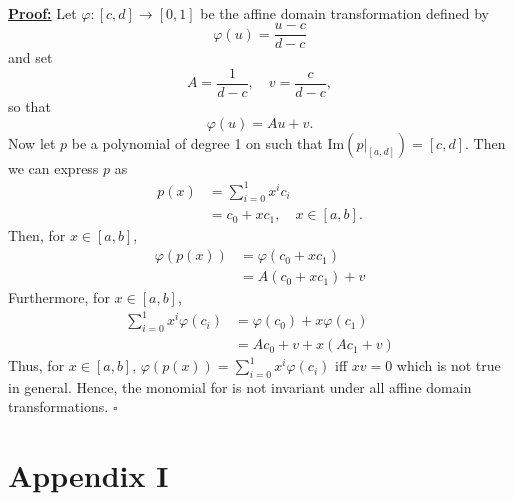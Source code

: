 \documentclass[]{article}
\begin{document}
\\
\underline{\textbf{Proof:}} Let $\varphi:[c, d]\rightarrow [0, 1]$ be the affine domain transformation defined by \begin{equation*}
\varphi(u) = \frac{u - c}{d - c}
\end{equation*} 
and set \begin{equation*}
A=\frac{1}{d-c}, \quad v = \frac{c}{d - c},
\end{equation*}
so that \begin{equation*}
\varphi(u) = Au + v.
\end{equation*}
Now let $p$ be a polynomial of degree 1 on such that $\mathrm{Im}(p|_{[a, d]}) = [c, d]$. Then we can express $p$ as \begin{equation*}
\begin{aligned}
p(x) &= \sum_{i=0}^{1}x^ic_i\\
&=c_0 + xc_1, \quad x\in [a, b].
\end{aligned}
\end{equation*}
Then, for $x\in [a, b]$, \begin{equation*}
\begin{aligned}
\varphi(p(x)) &= \varphi(c_0 + xc_1)\\
&=A(c_0 + xc_1) + v
\end{aligned}
\end{equation*}
Furthermore, for $x\in [a, b]$, \begin{equation*}
\begin{aligned}
\sum_{i=0}^{1} x^i\varphi(c_i) &= \varphi(c_0) + x\varphi(c_1)\\
&=Ac_0 + v + x(Ac_1 + v)
\end{aligned}
\end{equation*}
Thus, for $x\in[a, b]$, $\varphi(p(x)) = \sum_{i = 0}^{1}x^i\varphi(c_i)$ iff $xv = 0$ which is not true in general. Hence, the monomial for is not invariant under all affine domain transformations. $\square$

\newpage
\section*{Appendix I}

\end{document}
